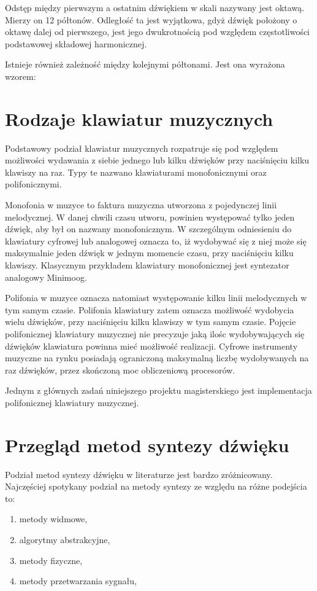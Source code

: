 Odstęp między pierwszym a ostatnim dźwiękiem w skali nazywany jest oktawą. Mierzy on 12 półtonów. Odległość ta jest wyjątkowa, gdyż dźwięk położony o oktawę dalej od pierwszego, jest jego dwukrotnością pod względem częstotliwości podstawowej składowej harmonicznej.

Istnieje również zależność między kolejnymi półtonami. Jest ona wyrażona wzorem:



\section{Rodzaje klawiatur muzycznych}
Podstawowy podział klawiatur muzycznych rozpatruje się pod względem możliwości wydawania z siebie jednego lub kilku dźwięków przy naciśnięciu kilku klawiszy na raz. Typy te nazwano klawiaturami monofonicznymi oraz polifonicznymi.

Monofonia w muzyce to faktura muzyczna utworzona z pojedynczej linii melodycznej. W danej chwili czasu utworu, powinien występować tylko jeden dźwięk, aby był on nazwany monofonicznym. W szczególnym odniesieniu do klawiatury cyfrowej lub analogowej oznacza to, iż wydobywać się z niej może się maksymalnie jeden dźwięk w jednym momencie czasu, przy naciśnięciu kilku klawiszy. Klasycznym przykładem klawiatury monofonicznej jest syntezator analogowy Minimoog.

Polifonia w muzyce oznacza natomiast występowanie kilku linii melodycznych w tym samym czasie. Polifonia klawiatury zatem oznacza możliwość wydobycia wielu dźwięków, przy naciśnięciu kilku klawiszy w tym samym czasie. Pojęcie polifonicznej klawiatury muzycznej nie precyzuje jaką ilośc wydobywających się dźwięków klawiatura powinna mieć możliwość realizacji. Cyfrowe instrumenty muzyczne na rynku posiadają ograniczoną maksymalną liczbę wydobywanych na raz dźwięków, przez skończoną moc obliczeniową procesorów.

%
%

Jednym z głównych zadań niniejszego projektu magisterskiego jest implementacja polifonicznej klawiatury muzycznej.



\section{Przegląd metod syntezy dźwięku}
Podział metod syntezy dźwięku w literaturze jest bardzo zróżnicowany. Najczęściej spotykany podział na metody syntezy ze względu na różne podejścia to:
\begin{enumerate}
	\item metody widmowe,
	\item algorytmy abstrakcyjne,
	\item metody fizyczne,
	\item metody przetwarzania sygnału,
\end{enumerate}

